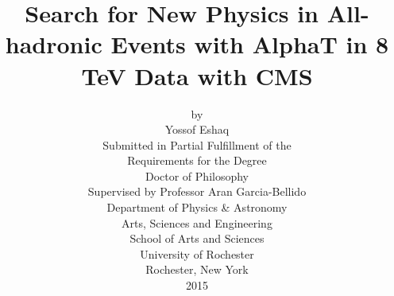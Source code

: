\documentclass[12pt,twoside,notitlepage]{article}
\newcommand{\clearemptydoublepage}{\newpage{\pagestyle{empty}\cleardoublepage}}
\begin{document}

\thispagestyle{plain}
\begin{titlepage}

  \title{{\boldmath Search for New Physics in All-hadronic Events with AlphaT in 8 TeV Data with CMS}}

  \author{
    by\\[0.3cm]
    Yossof Eshaq\\[0.8cm]
    {Submitted in Partial Fulfillment of the }\\[0.3cm]
    {Requirements for the Degree}\\[0.3cm]
    {Doctor of Philosophy}\\[0.8cm]
    Supervised by Professor Aran Garcia-Bellido\\[0.8cm]
    Department of Physics \& Astronomy\\[0.3cm]
    Arts, Sciences and Engineering \\[0.3cm]
    School of Arts and Sciences\\[0.8cm]
    University of Rochester\\[0.3cm]
    Rochester, New York\\[0.3cm]
    2015
  }
\date{}

\maketitle
\thispagestyle{empty}

\end{titlepage}



\pagestyle{fancyplain}
\renewcommand\headrule{}
\lhead{}
\chead{}
\rhead{\thepage}
\lfoot{}
\cfoot{}
\rfoot{}

\doublespacing
\clearemptydoublepage

\setcounter{page}{2}


\pagestyle{fancyplain}







\clearpage


\end{document}
